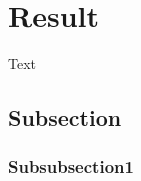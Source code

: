 
\section{Result}\label{sec:result}
Text

\subsection{Subsection}


\subsubsection{Subsubsection1}

